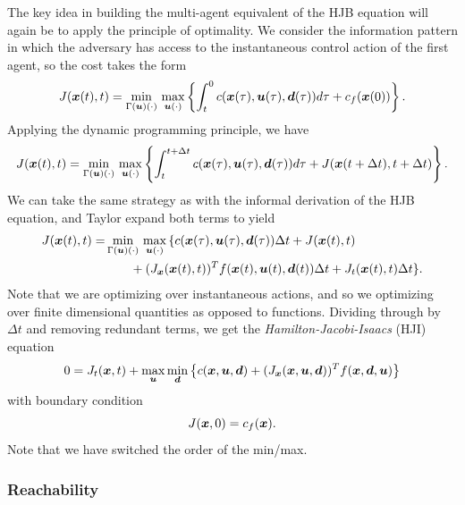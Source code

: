 The key idea in building the multi-agent equivalent of the HJB equation will again be to apply the principle of optimality. We consider the information pattern in which the adversary has access to the instantaneous control action of the first agent, so the cost takes the form
\begin{equation}
    J(\bm{x}(t),t) = \min_{\Gamma(\bm{u})(\cdot)}\,\max_{\bm{u}(\cdot)} \left\{ \int_t^0 c(\bm{x}(\tau), \bm{u}(\tau),\bm{d}(\tau)) d\tau + c_f(\bm{x}(0)) \right\}.
\end{equation}
Applying the dynamic programming principle, we have 
\begin{equation}
    J(\bm{x}(t),t) = \min_{\Gamma(\bm{u})(\cdot)}\,\max_{\bm{u}(\cdot)} \left\{ \int_t^{t+\Delta t} c(\bm{x}(\tau), \bm{u}(\tau),\bm{d}(\tau)) d\tau + J(\bm{x}(t+\Delta t),t+\Delta t)\right\}.
\end{equation}
We can take the same strategy as with the informal derivation of the HJB equation, and Taylor expand both terms to yield
\begin{align}
    J(\bm{x}(t),t) =& \min_{\Gamma(\bm{u})(\cdot)}\,\max_{\bm{u}(\cdot)} {\large\{} c(\bm{x}(\tau), \bm{u}(\tau),\bm{d}(\tau))\Delta t + J(\bm{x}(t),t)\\
    &\qquad + (J_{\bm{x}}(\bm{x}(t),t))^T f(\bm{x}(t),\bm{u}(t),\bm{d}(t)) \Delta t + J_t(\bm{x}(t),t) \Delta t {\large\}}. \nonumber
\end{align}
Note that we are optimizing over instantaneous actions, and so we optimizing over finite dimensional quantities as opposed to functions. Dividing through by $\Delta t$ and removing redundant terms, we get the \textit{Hamilton-Jacobi-Isaacs} (HJI) equation
\begin{equation}
    0 = J_t(\bm{x},t) + \max_{\bm{u}} \min_{\bm{d}} \left\{ c(\bm{x},\bm{u},\bm{d}) + (J_{\bm{x}}(\bm{x},\bm{u},\bm{d}))^T f(\bm{x},\bm{d},\bm{u}) \right\}
\end{equation}
with boundary condition
\begin{equation}
    J(\bm{x},0) = c_f(\bm{x}).
\end{equation}
Note that we have switched the order of the min/max.

\subsubsection{Reachability}

